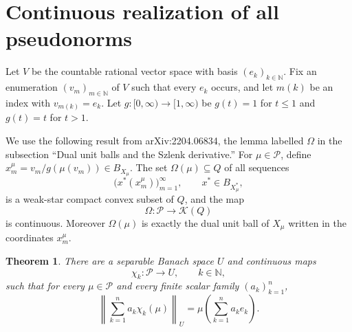 \documentclass[11pt]{article}
\newtheorem{theorem}{Theorem}
\newcommand{\PP}{\mathcal P}
\newcommand{\Nat}{\mathbb N}
\newcommand{\K}{\mathcal K}
\begin{document}
\section*{Continuous realization of all pseudonorms}

Let \(V\) be the countable rational vector space with basis
\((e_k)_{k\in\Nat}\). Fix an enumeration \((v_m)_{m\in\Nat}\) of \(V\) such
that every \(e_k\) occurs, and let \(m(k)\) be an index with \(v_{m(k)}=e_k\).
Let \(g:[0,\infty)\to[1,\infty)\) be \(g(t)=1\) for \(t\leq 1\) and \(g(t)=t\)
for \(t>1\).

We use the following result from arXiv:2204.06834, the lemma labelled
\(\Omega\) in the subsection ``Dual unit balls and the Szlenk derivative.'' For
\(\mu\in\PP\), define \(x_m^\mu=v_m/g(\mu(v_m))\in B_{X_\mu}\). The set
\(\Omega(\mu)\subseteq Q\) of all sequences
\[
\bigl(x^*(x_m^\mu)\bigr)_{m=1}^\infty,\qquad x^*\in B_{X_\mu^*},
\]
is a weak-star compact convex subset of \(Q\), and the map
\[
\Omega:\PP\to \K(Q)
\]
is continuous. Moreover \(\Omega(\mu)\) is exactly the dual unit ball of
\(X_\mu\) written in the coordinates \(x_m^\mu\).

\begin{theorem}
\label{thm:continuous-realization}
There are a separable Banach space \(U\) and continuous maps
\[
\chi_k:\PP\to U,\qquad k\in\Nat,
\]
such that for every \(\mu\in\PP\) and every finite scalar family
\((a_k)_{k=1}^n\),
\[
\left\|\sum_{k=1}^n a_k\chi_k(\mu)\right\|_U
 =
\mu\left(\sum_{k=1}^n a_ke_k\right).
\]
\end{theorem}
\end{document}
